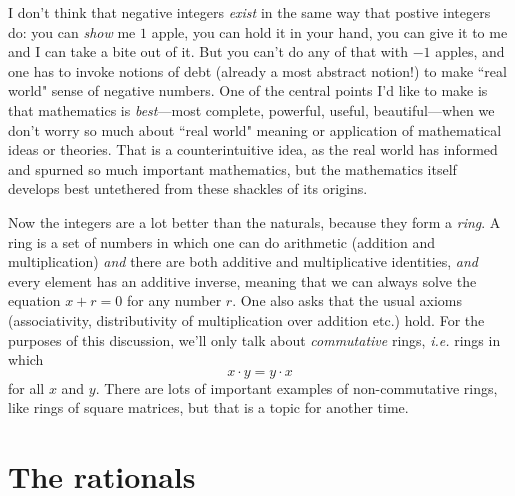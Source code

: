 \documentclass[11pt]{amsart}
\theoremstyle{plain}
\theoremstyle{definition}
\theoremstyle{remark}
\numberwithin{theorem}{section}
\numberwithin{equation}{section}
\begin{document}
I don't think that negative integers {\em exist} in the same way that postive integers do: you can {\em show} me $1$ apple, you can hold it in your hand,
you can give it to me and I can take a bite out of it.  But you can't do any of that with $-1$ apples, and one has to invoke notions of debt (already a most abstract notion!) to make ``real world" sense of negative numbers. One of the central points I'd like to make is that mathematics is {\em best}---most complete, powerful, useful, beautiful---when we don't worry so much about ``real world" meaning or application of mathematical ideas or theories.  That is a counterintuitive idea, 
as the real world has informed and spurned so much important mathematics, but the mathematics itself develops best untethered from these shackles of its origins.

Now the integers are a lot better than the naturals, because they form a {\em ring}.  A ring is a set of numbers in which one can do arithmetic
(addition and multiplication) {\em and} there are both additive and multiplicative identities, {\em and} every element has an additive inverse,
meaning that we can always solve the equation $x+r = 0$ for any number $r$.  One also asks that the usual axioms (associativity, distributivity of
multiplication over addition etc.) hold.  For the purposes of this discussion, we'll only talk about {\em commutative} rings, {\em i.e.} rings in which
$$x\cdot y = y\cdot x$$
for all $x$ and $y$.  There are lots of important examples of non-commutative rings, like rings of square matrices, but that is a topic for another time.


\section{The rationals}
\end{document}

